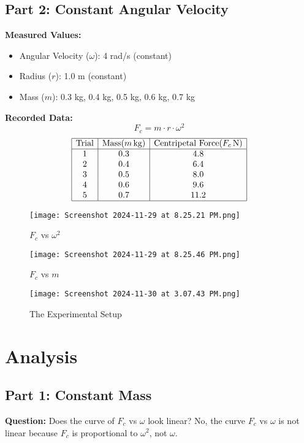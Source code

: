 \documentclass{report}
\begin{document}
\subsection{Part 2: Constant Angular Velocity}
\textbf{Measured Values:}
\begin{itemize}
    \item Angular Velocity (\( \omega \)): 4 rad/s (constant)
    \item Radius (\( r \)): 1.0 m (constant)
    \item Mass (\( m \)): 0.3 kg, 0.4 kg, 0.5 kg, 0.6 kg, 0.7 kg
\end{itemize}

\textbf{Recorded Data:}
\[
F_c = m \cdot r \cdot \omega^2
\]
\[
\begin{array}{|c|c|c|}
\hline
\text{Trial} & \text{Mass} (m \, \text{kg}) & \text{Centripetal Force} (F_c \, \text{N}) \\
\hline
1 & 0.3 & 4.8 \\
2 & 0.4 & 6.4 \\
3 & 0.5 & 8.0 \\
4 & 0.6 & 9.6 \\
5 & 0.7 & 11.2 \\
\hline
\end{array}
\]
\begin{figure}[h!]
    \centering
    \texttt{[image: Screenshot 2024-11-29 at 8.25.21 PM.png]}
    \caption{\( F_c \) vs \( \omega^2 \)}
    \label{fig:fc_vs_omega2}
\end{figure}

\begin{figure}[h!]
    \centering
    \texttt{[image: Screenshot 2024-11-29 at 8.25.46 PM.png]}
    \caption{\( F_c \) vs \( m \)}
    \label{fig:fc_vs_m}
\end{figure}

\begin{figure}
    \centering
    \texttt{[image: Screenshot 2024-11-30 at 3.07.43 PM.png]}
    \caption{The Experimental Setup}
    \label{fig:enter-label}
\end{figure}

\section{Analysis}
\subsection{Part 1: Constant Mass}
\textbf{Question:} Does the curve of \( F_c \) vs \( \omega \) look linear?  
No, the curve \( F_c \) vs \( \omega \) is not linear because \( F_c \) is proportional to \( \omega^2 \), not \( \omega \).  
\end{document}
